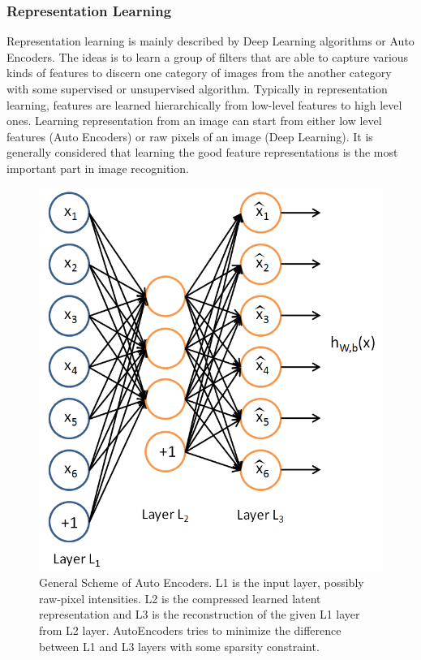 \subsubsection{Representation Learning}
Representation learning is mainly described by Deep Learning 
algorithms\cite{krizhevsky2012imagenet} or Auto Encoders\cite{bengio2007scaling}. The ideas is to learn a group of filters that are able to capture various kinds of features to discern one category of images from the another category with some supervised or unsupervised algorithm. Typically in representation learning, features are learned hierarchically from low-level features to high level ones. 
Learning representation from an image can start from either low level features (Auto Encoders) or raw pixels of an image (Deep Learning). It is generally considered that learning the good feature representations is the most important part in image recognition.
\begin{figure}
	\centering
	\includegraphics[scale=.3]{introduction/fig/sparsecoding.png}
	\caption{General Scheme of Auto Encoders. L1 is the input layer, possibly raw-pixel intensities. L2 is the compressed learned latent representation and L3 is the reconstruction of the given L1 layer from L2 layer. AutoEncoders tries to minimize the difference between L1 and L3 layers with some sparsity constraint.}\label{fig:intro:sparse}
\end{figure}

